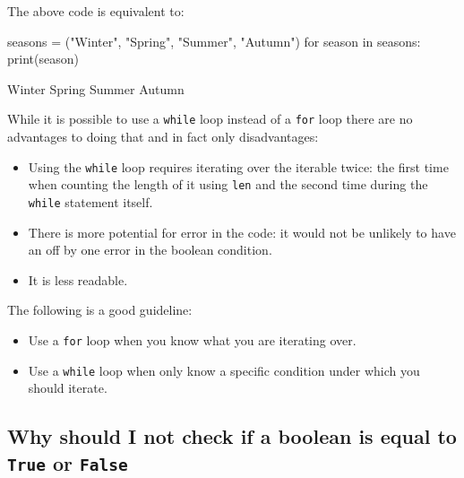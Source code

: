 The above code is equivalent to:




\begin{pyin}
seasons = ("Winter", "Spring", "Summer", "Autumn")
for season in seasons:
    print(season)
\end{pyin}





\begin{raw}
Winter
Spring
Summer
Autumn
\end{raw}





While it is possible to use a \texttt{while} loop instead of a \texttt{for} loop there are no
advantages to doing that and in fact only disadvantages:
\begin{itemize}
\item 

Using the \texttt{while} loop requires iterating over the iterable twice: the first
time when counting the length of it using \texttt{len} and the second time during the
\texttt{while} statement itself.

\item 

There is more potential for error in the code: it would not be unlikely to
have an off by one error in the boolean condition.

\item 

It is less readable.

\end{itemize}


The following is a good guideline:
\begin{itemize}
\item 

Use a \texttt{for} loop when you know what you are iterating over.

\item 

Use a \texttt{while} loop when only know a specific condition under which you should
iterate.

\end{itemize}


\subsection{Why should I not check if a boolean is equal to \texttt{True} or \texttt{False}}

